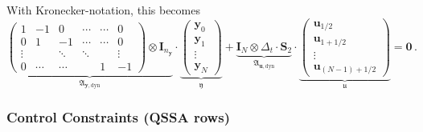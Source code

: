 \documentclass{article}
\newcommand{\kron}{\otimes}%
\newcommand{\vectorfont}[1]{\boldsymbol{#1}}%
\newcommand{\greekvectorfont}[1]{\boldsymbol{#1}}%
\newcommand{\matrixfont}[1]{\mathbf{#1}}%
\newcommand{\uvec}{\vectorfont{u}}
\newcommand{\yvec}{\vectorfont{y}}
\newcommand{\ufrakvec}{\vectorfont{\mathfrak{u}}}
\newcommand{\yfrakvec}{\vectorfont{\mathfrak{y}}}
\newcommand{\nullvec}{\greekvectorfont{0}}
\newcommand{\Imat}{\matrixfont{I}}%
\newcommand{\Smat}{\matrixfont{S}}
\newcommand{\Afrakmat}{\matrixfont{\mathfrak{A}}}
\begin{document}
With Kronecker-notation, this becomes
\[
\underbrace{
\begin{pmatrix}
	1      & -1     &  0     & \cdots & \cdots & 0 \\
	0      &  1     & -1     & \cdots & \cdots & 0 \\
	\vdots &        & \ddots & \ddots &        & \vdots \\
	0      & \cdots & \cdots &        & 1      & -1
\end{pmatrix}
\kron \Imat_{n_{\yvec}} 
}_{\Afrakmat_{\yvec,\mathrm{dyn}}} 
\cdot 
\underbrace{
\begin{pmatrix}
	\yvec_0 \\ \yvec_1 \\ \vdots \\ \yvec_N
\end{pmatrix}
}_{\yfrakvec}
+
\underbrace{
\Imat_{N} \kron \Delta_t \cdot \Smat_2
}_{\Afrakmat_{\uvec, \mathrm{dyn}}}
\cdot
\underbrace{
\begin{pmatrix}
	\uvec_{1/2} \\ \uvec_{1+1/2} \\ \vdots \\ \uvec_{(N-1)+1/2}
\end{pmatrix}
}_{\ufrakvec}
= \nullvec\,.
\]
\subsubsection*{Control Constraints (QSSA rows)}
\end{document}
